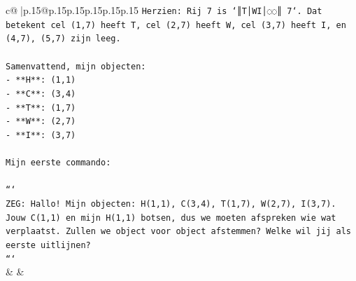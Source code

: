\documentclass{article}
\begin{document}
{\begin{supertabular}{c@{$\;$}|p{.15\linewidth}@{}p{.15\linewidth}p{.15\linewidth}p{.15\linewidth}p{.15\linewidth}p{.15\linewidth}}
{{{\texttt{Herzien: Rij 7 is `║T│WI│◌◌║ 7`. Dat betekent cel (1,7) heeft T, cel (2,7) heeft W, cel (3,7) heeft I, en (4,7), (5,7) zijn leeg.} \\
\\ 
\texttt{Samenvattend, mijn objecten:} \\
\texttt{{-} **H**: (1,1)} \\
\texttt{{-} **C**: (3,4)} \\
\texttt{{-} **T**: (1,7)} \\
\texttt{{-} **W**: (2,7)} \\
\texttt{{-} **I**: (3,7)} \\
\\ 
\texttt{Mijn eerste commando:} \\
\\ 
\texttt{```} \\
\texttt{ZEG: Hallo! Mijn objecten: H(1,1), C(3,4), T(1,7), W(2,7), I(3,7). Jouw C(1,1) en mijn H(1,1) botsen, dus we moeten afspreken wie wat verplaatst. Zullen we object voor object afstemmen? Welke wil jij als eerste uitlijnen?} \\
\texttt{```} \\
            }
        }
    }
    & & \\ \\


\end{supertabular}}
\end{document}

